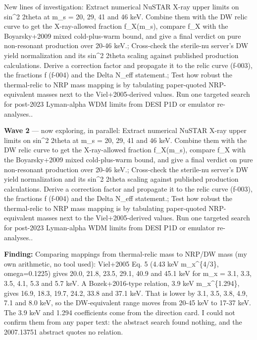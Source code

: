 \documentclass[11pt,a4paper]{article}
\begin{document}
New lines of investigation: Extract numerical NuSTAR X-ray upper limits on sin\textasciicircum{}2 2theta at m\_s = 20, 29, 41 and 46 keV. Combine them with the DW relic curve to get the X-ray-allowed fraction f\_X(m\_s), compare f\_X with the Boyarsky+2009 mixed cold-plus-warm bound, and give a final verdict on pure non-resonant production over 20-46 keV.; Cross-check the sterile-nu server's DW yield normalization and its sin\textasciicircum{}2 2theta scaling against published production calculations. Derive a correction factor and propagate it to the relic curve (f-003), the fractions f (f-004) and the Delta N\_eff statement.; Test how robust the thermal-relic to NRP mass mapping is by tabulating paper-quoted NRP-equivalent masses next to the Viel+2005-derived values. Run one targeted search for post-2023 Lyman-alpha WDM limits from DESI P1D or emulator re-analyses..

\textbf{Wave 2} --- now exploring, in parallel: Extract numerical NuSTAR X-ray upper limits on sin\textasciicircum{}2 2theta at m\_s = 20, 29, 41 and 46 keV. Combine them with the DW relic curve to get the X-ray-allowed fraction f\_X(m\_s), compare f\_X with the Boyarsky+2009 mixed cold-plus-warm bound, and give a final verdict on pure non-resonant production over 20-46 keV.; Cross-check the sterile-nu server's DW yield normalization and its sin\textasciicircum{}2 2theta scaling against published production calculations. Derive a correction factor and propagate it to the relic curve (f-003), the fractions f (f-004) and the Delta N\_eff statement.; Test how robust the thermal-relic to NRP mass mapping is by tabulating paper-quoted NRP-equivalent masses next to the Viel+2005-derived values. Run one targeted search for post-2023 Lyman-alpha WDM limits from DESI P1D or emulator re-analyses..

\textbf{Finding:} Comparing mappings from thermal-relic mass to NRP/DW mass (my own arithmetic, no tool used): Viel+2005 Eq. 5 (4.43 keV m\_x\textasciicircum{}\{4/3\}, omega=0.1225) gives 20.0, 21.8, 23.5, 29.1, 40.9 and 45.1 keV for m\_x = 3.1, 3.3, 3.5, 4.1, 5.3 and 5.7 keV. A Bozek+2016-type relation, 3.9 keV m\_x\textasciicircum{}\{1.294\}, gives 16.9, 18.3, 19.7, 24.2, 33.8 and 37.1 keV. That is lower by 3.1, 3.5, 3.8, 4.9, 7.1 and 8.0 keV, so the DW-equivalent range moves from 20-45 keV to 17-37 keV. The 3.9 keV and 1.294 coefficients come from the direction card. I could not confirm them from any paper text: the abstract search found nothing, and the 2007.13751 abstract quotes no relation.
\end{document}
